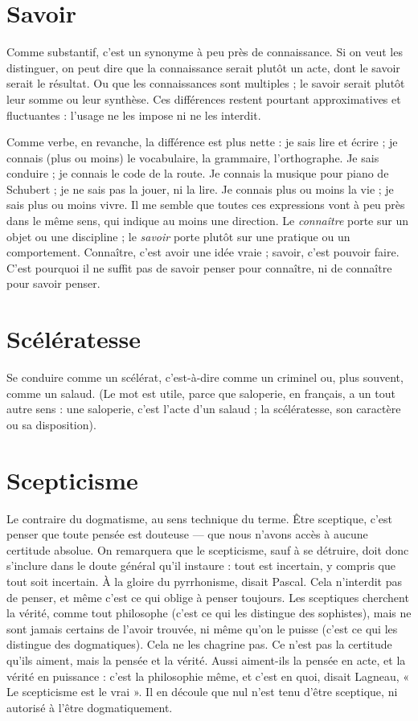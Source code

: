 \section{Savoir}
Comme substantif, c’est un synonyme à peu près de connaissance.
Si on veut les distinguer, on peut dire que la connaissance serait
plutôt un acte, dont le savoir serait le résultat. Ou que les connaissances sont
multiples ; le savoir serait plutôt leur somme ou leur synthèse. Ces différences
restent pourtant approximatives et fluctuantes : l’usage ne les impose ni ne les
interdit.

Comme verbe, en revanche, la différence est plus nette : je sais lire et
écrire ; je connais (plus ou moins) le vocabulaire, la grammaire, l'orthographe.
Je sais conduire ; je connais le code de la route. Je connais la musique pour
piano de Schubert ; je ne sais pas la jouer, ni la lire. Je connais plus ou moins
la vie ; je sais plus ou moins vivre. Il me semble que toutes ces expressions vont
à peu près dans le même sens, qui indique au moins une direction. Le {\it connaître}
porte sur un objet ou une discipline ; le {\it savoir} porte plutôt sur une pratique ou
un comportement. Connaître, c’est avoir une idée vraie ; savoir, c’est pouvoir
faire. C’est pourquoi il ne suffit pas de savoir penser pour connaître, ni de
connaître pour savoir penser.

\section{Scélératesse}
Se conduire comme un scélérat, c’est-à-dire comme un criminel
ou, plus souvent, comme un salaud. (Le mot est
utile, parce que saloperie, en français, a un tout autre sens : une saloperie, c’est
l’acte d’un salaud ; la scélératesse, son caractère ou sa disposition).

\section{Scepticisme}
Le contraire du dogmatisme, au sens technique du terme.
Être sceptique, c’est penser que toute pensée est douteuse —
que nous n’avons accès à aucune certitude absolue. On remarquera que le scepticisme,
sauf à se détruire, doit donc s’inclure dans le doute général qu’il
instaure : tout est incertain, y compris que tout soit incertain. À la gloire du
pyrrhonisme, disait Pascal. Cela n’interdit pas de penser, et même c’est ce qui
oblige à penser toujours. Les sceptiques cherchent la vérité, comme tout philosophe
(c’est ce qui les distingue des sophistes), mais ne sont jamais certains de
l'avoir trouvée, ni même qu’on le puisse (c’est ce qui les distingue des
dogmatiques). Cela ne les chagrine pas. Ce n’est pas la certitude qu’ils aiment,
mais la pensée et la vérité. Aussi aiment-ils la pensée en acte, et la vérité en
puissance : c’est la philosophie même, et c’est en quoi, disait Lagneau, « Le scepticisme
est le vrai ». Il en découle que nul n’est tenu d’être sceptique, ni autorisé
à l’être dogmatiquement.

